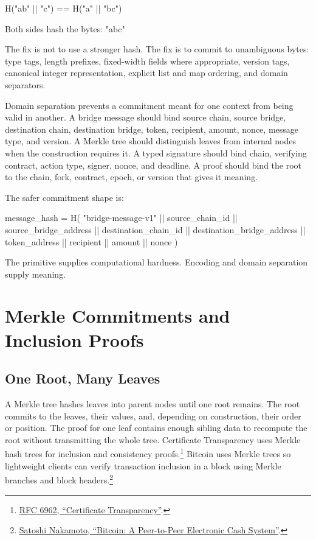 \begin{codeblock}
H("ab" || "c") == H("a" || "bc")

Both sides hash the bytes:
    "abc"
\end{codeblock}

The fix is not to use a stronger hash. The fix is to commit to unambiguous bytes: type tags, length prefixes, fixed-width fields where appropriate, version tags, canonical integer representation, explicit list and map ordering, and domain separators.

Domain separation prevents a commitment meant for one context from being valid in another. A bridge message should bind source chain, source bridge, destination chain, destination bridge, token, recipient, amount, nonce, message type, and version. A Merkle tree should distinguish leaves from internal nodes when the construction requires it. A typed signature should bind chain, verifying contract, action type, signer, nonce, and deadline. A proof should bind the root to the chain, fork, contract, epoch, or version that gives it meaning.

The safer commitment shape is:

\begin{codeblock}
message_hash = H(
    "bridge-message-v1" ||
    source_chain_id ||
    source_bridge_address ||
    destination_chain_id ||
    destination_bridge_address ||
    token_address ||
    recipient ||
    amount ||
    nonce
)
\end{codeblock}

The primitive supplies computational hardness. Encoding and domain separation supply meaning.

\section{Merkle Commitments and Inclusion Proofs}

\subsection{One Root, Many Leaves}

A Merkle tree hashes leaves into parent nodes until one root remains. The root commits to the leaves, their values, and, depending on construction, their order or position. The proof for one leaf contains enough sibling data to recompute the root without transmitting the whole tree. Certificate Transparency uses Merkle hash trees for inclusion and consistency proofs.\footnote{\href{https://datatracker.ietf.org/doc/html/rfc6962}{RFC 6962, ``Certificate Transparency''}.} Bitcoin uses Merkle trees so lightweight clients can verify transaction inclusion in a block using Merkle branches and block headers.\footnote{\href{https://bitcoin.org/bitcoin.pdf}{Satoshi Nakamoto, ``Bitcoin: A Peer-to-Peer Electronic Cash System''}.}

